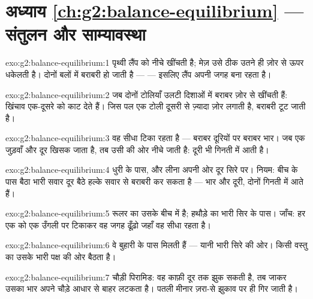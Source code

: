 \section*{अध्याय \ref{ch:g2:balance-equilibrium} --- संतुलन और साम्यावस्था}

\begin{solution}{exo:g2:balance-equilibrium:1}
पृथ्वी लैंप को नीचे खींचती है; मेज़ उसे ठीक उतने ही ज़ोर से ऊपर
धकेलती है। दोनों बलों में बराबरी हो जाती है ---  ---
इसलिए लैंप अपनी जगह बना रहता है।
\end{solution}

\begin{solution}{exo:g2:balance-equilibrium:2}
जब दोनों टोलियाँ उलटी दिशाओं में बराबर ज़ोर से खींचती हैं: खिंचाव
एक-दूसरे को काट देते हैं। जिस पल एक टोली दूसरी से ज़्यादा ज़ोर लगाती
है, बराबरी टूट जाती है।
\end{solution}

\begin{solution}{exo:g2:balance-equilibrium:3}
वह सीधा टिका रहता है --- बराबर दूरियों पर बराबर भार। जब एक जुड़वाँ और
दूर खिसक जाता है, तब उसी की ओर नीचे जाती है: दूरी भी गिनती में आती
है।
\end{solution}

\begin{solution}{exo:g2:balance-equilibrium:4}
धुरी के पास, और लीना अपनी ओर दूर सिरे पर। नियम: बीच के पास बैठा भारी
सवार दूर बैठे हल्के सवार से बराबरी कर सकता है --- भार और दूरी, दोनों
गिनती में आते हैं।
\end{solution}

\begin{solution}{exo:g2:balance-equilibrium:5}
रूलर का  उसके बीच में है; हथौड़े का भारी सिर के पास।
जाँच: हर एक को एक उँगली पर टिकाकर वह जगह ढूँढ़ो जहाँ वह सीधा रहता
है।
\end{solution}

\begin{solution}{exo:g2:balance-equilibrium:6}
वे बुहारी के पास मिलती हैं --- यानी भारी सिरे की ओर। किसी वस्तु का
 उसके भारी पक्ष की ओर बैठता है।
\end{solution}

\begin{solution}{exo:g2:balance-equilibrium:7}
चौड़ी पिरामिड: वह काफ़ी दूर तक झुक सकती है, तब जाकर उसका भार अपने
चौड़े आधार से बाहर लटकता है। पतली मीनार ज़रा-से झुकाव पर ही गिर जाती
है।
\end{solution}

